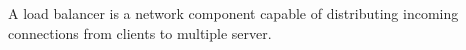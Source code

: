 

\FloatBarrier
A load balancer is a network component capable of distributing incoming connections from clients to multiple server.

